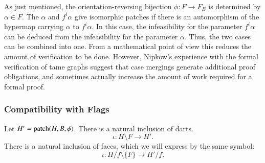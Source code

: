 \begin{remark} As just mentioned, the orientation-reversing bijection $\phi:F\to F_B$
is determined by $\alpha\in F$.  The $\alpha$ and $f^i\alpha$ give
isomorphic patches if there is an automorphism of the hypermap
carrying $\alpha$ to $f^i\alpha$.  In this case, the infeasibility
for the parameter $f^i\alpha$ can be deduced from the
infeasibility for the parameter $\alpha$.  Thus, the two cases can
be combined into one.  From a mathematical point of view this
reduces the amount of verification to be done.  However, Nipkow's
experience with the formal verification of tame graphs suggest
that case mergings generate additional proof obligations, and
sometimes actually increase the amount of work required for a
formal proof.
\end{remark}








\subsubsection{Compatibility with Flags}
\label{sec:com}

Let $H'={\operatorname{patch}}(H,B,\phi)$.   There is a natural inclusion of
darts.
    $$
    \iota: H\setminus F \to H'.
    $$
There is a natural inclusion of faces, which we will express by
the same symbol:
    $$
    \iota: H/f \setminus \{F\}\to H'/f.
    $$

